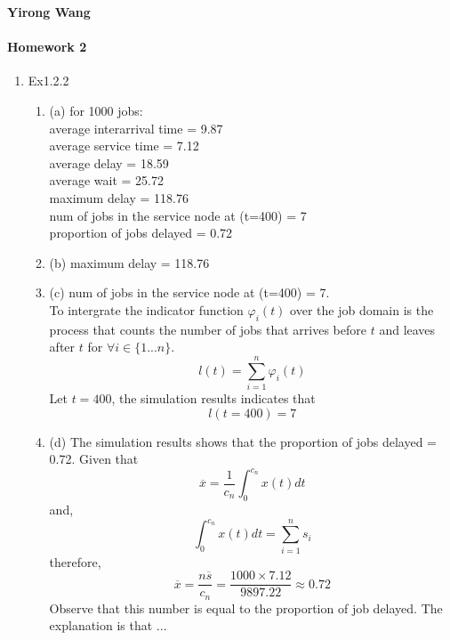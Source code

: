 \documentclass[11pt]{article}
\theoremstyle{definition}
\begin{document}
\renewcommand{\labelenumii}{{\bfseries \em \arabic{enumi}.\arabic{enumii}}}
\newcommand{\problemitem}{\renewcommand{\labelenumi}{{\bfseries \em Problem \arabic{enumi}}}\item}
\newcommand{\solutionitem}{\renewcommand{\labelenumi}{{\bfseries \em Solution \arabic{enumi}}}\addtocounter{enumi}{-1}\item}
\newenvironment{solution}{\par\color{DarkBlue}}{\par}
{\noindent \textbf{Yirong Wang} }

\paragraph{Homework 2}
\begin{enumerate}[leftmargin=0pt, itemsep=3ex]

    \problemitem Ex1.2.2
        \begin{enumerate}
        \item (a) for 1000 jobs:
   \\ average interarrival time = 9.87
   \\ average service time = 7.12
   \\ average delay = 18.59
   \\ average wait = 25.72
   \\ maximum delay = 118.76
   \\ num of jobs in the service node at (t=400) = 7
   \\ proportion of jobs delayed = 0.72
    
    \item (b) maximum delay = 118.76
    \item (c) num of jobs in the service node at (t=400) = 7.
    \\To intergrate the indicator function $\varphi_i(t)$ over the job domain is the process that counts the number of jobs  that arrives before $t$ and leaves after $t$ for $\forall i \in \{1...n\}$.
    $$l(t) = \sum_{i=1}^{n} \varphi_i(t)$$ Let $t=400$, the simulation results indicates that $$l(t=400) = 7$$ 
    \item (d) The simulation results shows that the proportion of jobs delayed = 0.72. Given that $$\overline{x} = \frac{1}{c_n} \int_{0}^{c_n}x(t)dt$$
    and, $$\int_{0}^{c_n}x(t)dt = \sum_{i=1}^{n}s_i$$
    therefore, $$\overline{x} = \frac{n \overline{s}}{c_n} = \frac{1000 \times 7.12}{9897.22} \approx 0.72$$
    Observe that this number is equal to the proportion of job delayed. The explanation is that ...
    

\end{enumerate}
\end{enumerate}
\end{document}
